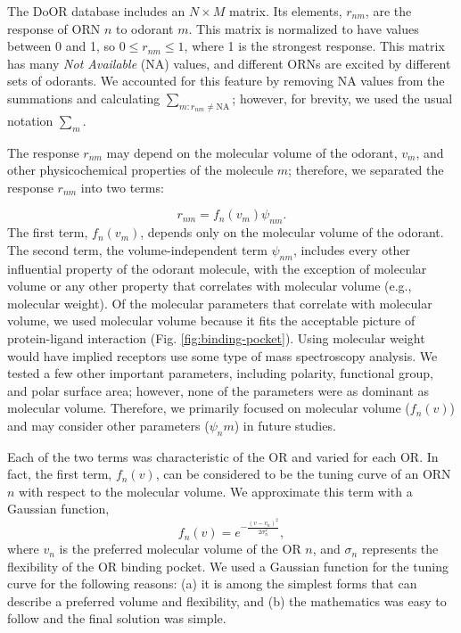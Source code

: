 \documentclass[fleqn,11pt]{wlscirep}
\begin{document}
The DoOR database includes an $N\times M$ matrix. 
Its elements, $r_{nm}$, are the response of ORN $n$ to odorant $m$. 
This matrix is normalized to have values between 0 and 1, so $0 \le r_{nm} \le 1$, where 1 is the strongest response.
This matrix has many {\it Not Available} (NA) values, 
and different ORNs are excited by different sets of odorants. 
We accounted for this feature by removing NA values from the summations and calculating $\sum_{m: r_{nm} \neq \text{NA}}$; however, 
for brevity, we used the usual notation $\sum_m$.

The response $r_{nm}$ may depend on the molecular volume of the odorant, $v_m$, 
and other physicochemical properties of the molecule $m$; 
therefore, we separated the response $r_{nm}$ into two terms:

\begin{equation}
	r_{nm} = f_n(v_m) \psi_{nm}.
	\label{eqn:factors}
\end{equation}
The first term, $f_n(v_m)$, depends only on the molecular volume of the odorant.
The second term, the volume-independent term $\psi_{nm}$, 
includes every other influential property of the odorant molecule, with the exception of 
molecular volume or any other property that correlates with molecular volume (e.g., molecular weight).
Of the molecular parameters that correlate with molecular volume, 
we used molecular volume because it fits the acceptable picture of protein-ligand interaction (Fig. \ref{fig:binding-pocket}).
Using molecular weight would have implied receptors use some type of mass spectroscopy analysis. 
We tested a few other important parameters, including polarity, functional group, and polar surface area; 
however, none of the parameters were as dominant as molecular volume. 
Therefore, we primarily focused on molecular volume ($f_n(v)$) and may consider other parameters ($\psi_nm$) in future studies.

Each of the two terms was characteristic of the OR and varied for each OR.
In fact, the first term, $f_n(v)$, can be considered to be the tuning curve of an ORN $n$ with respect to the molecular volume. 
We approximate this term with a Gaussian function,  
\begin{equation}
	\displaystyle f_n(v) = e^{-\frac{(v-v_n)^2}{2\sigma^2_n}}, 
	\label{eqn:volume-dependence}
\end{equation}
where $v_n$ is the preferred molecular volume of the OR $n$, and $\sigma_n$ represents the flexibility of the OR binding pocket. 
We used a Gaussian function for the tuning curve for the following reasons: (a) it is among the simplest forms that can describe a preferred volume and flexibility, and 
(b) the mathematics was easy to follow and the final solution was simple.
\end{document}
